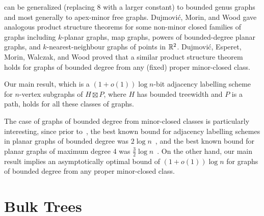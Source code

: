 \documentclass[kpfonts]{patmorin}
\begin{document}
 can be generalized (replacing $8$ with a larger constant) to 
bounded genus graphs and most generally to apex-minor free graphs.
Dujmović, Morin, and Wood \cite{dujmovic.morin.ea:structure} gave analogous product structure theorems for some non-minor closed families of graphs including $k$-planar graphs, map graphs, powers of bounded-degree planar graphs, and $k$-nearest-neighbour graphs of points in $\mathbb{R}^2$. Dujmović, Esperet, Morin, Walczak, and Wood \cite{DEMWW20} proved that a similar product structure theorem holds for graphs of bounded degree from any (fixed) proper minor-closed class.


Our main result, which is a $(1+o(1))\log n$-bit adjacency labelling scheme for $n$-vertex subgraphs of $H\boxtimes P$, where $H$ has bounded treewidth and $P$ is a path, holds for all these classes of graphs.

The case of graphs of bounded degree from minor-closed classes is particularly interesting, since prior to~\cite{bonamy.gavoille.ea:shorter}, the best known bound for adjacency labelling schemes in planar graphs of bounded degree was $2\log n$~\cite{chung:universal}, and the best known bound for planar graphs of maximum degree 4 was $\tfrac32 \log n$~\cite{AR14}. On the other hand, our main result implies an asymptotically optimal bound of $(1+o(1))\log n$ for graphs of bounded degree from any proper minor-closed class.


\section{Bulk Trees}
\end{document}
